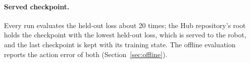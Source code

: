 \paragraph{Served checkpoint.} Every run evaluates the held-out loss about 20 times; the Hub repository's root holds the
checkpoint with the lowest held-out loss, which is served to the robot, and the last checkpoint is kept with its
training state. The offline evaluation reports the action error of both (Section~\ref{sec:offline}).

